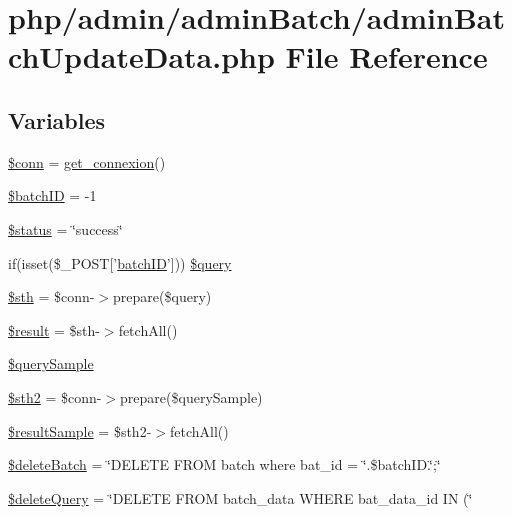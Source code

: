 \hypertarget{admin_batch_update_data_8php}{\section{php/admin/admin\-Batch/admin\-Batch\-Update\-Data.php File Reference}
\label{admin_batch_update_data_8php}
}
\subsection*{Variables}
\begin{DoxyCompactItemize}
\item 
\hyperlink{admin_batch_update_data_8php_aa8a5a87b9c1a6a0819b88447cbe41877}{\$conn} = \hyperlink{php__functions_8php_ace18bc10f3fd08f92688ac743e0d8c2e}{get\-\_\-connexion}()
\item 
\hyperlink{admin_batch_update_data_8php_aaa6d122ea9cb55b210aadd86e5654a74}{\$batch\-I\-D} = -\/1
\item 
\hyperlink{admin_batch_update_data_8php_a58391ea75f2d29d5d708d7050b641c33}{\$status} = \char`\"{}success\char`\"{}
\item 
if(isset(\$\-\_\-\-P\-O\-S\-T\mbox{[}'\hyperlink{obsolete_2processing__bak_8php_a88c5bc4262b7c34f236357f5c53fc99b}{batch\-I\-D}'\mbox{]})) \hyperlink{admin_batch_update_data_8php_ac52f8f4e9d798ceaf5b8ebbbf44651d7}{\$query}
\item 
\hyperlink{admin_batch_update_data_8php_afa9126f9664959c02795be300a135f93}{\$sth} = \$conn-\/$>$prepare(\$query)
\item 
\hyperlink{admin_batch_update_data_8php_a112ef069ddc0454086e3d1e6d8d55d07}{\$result} = \$sth-\/$>$fetch\-All()
\item 
\hyperlink{admin_batch_update_data_8php_aeb64e1676f1d4fa0af8d77c2cf92985e}{\$query\-Sample}
\item 
\hyperlink{admin_batch_update_data_8php_a2f84d43fa0033773278ae89295389bc6}{\$sth2} = \$conn-\/$>$prepare(\$query\-Sample)
\item 
\hyperlink{admin_batch_update_data_8php_ae3e385c534eade5527fe9db4dbc181b5}{\$result\-Sample} = \$sth2-\/$>$fetch\-All()
\item 
\hyperlink{admin_batch_update_data_8php_a402e013ee8591bfd08a5a09cb35c3cc8}{\$delete\-Batch} = \char`\"{}D\-E\-L\-E\-T\-E F\-R\-O\-M batch where bat\-\_\-id = \char`\"{}.\$batch\-I\-D.\char`\"{};\char`\"{}
\item 
\hyperlink{admin_batch_update_data_8php_ad08dc0a05af9c3e0730669485af92e41}{\$delete\-Query} = \char`\"{}D\-E\-L\-E\-T\-E F\-R\-O\-M batch\-\_\-data W\-H\-E\-R\-E bat\-\_\-data\-\_\-id I\-N (\char`\"{}

\end{DoxyCompactItemize}
